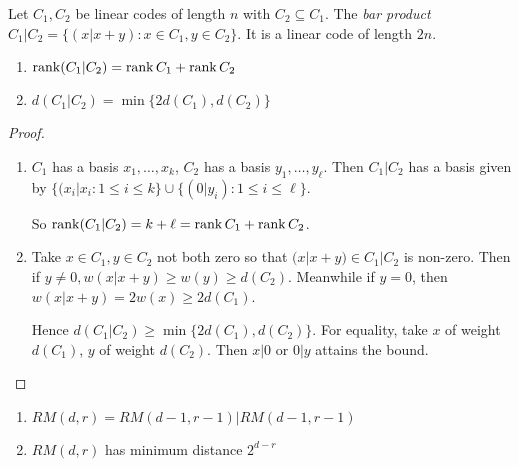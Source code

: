 \documentclass[10pt,a4paper]{article}
\begin{document}
Let $C_1, C_2$ be linear codes of length $n$ with $C_2 \subseteq C_1$. The \emph{bar product} $C_1|C_2 = \{(x|x+y) : x \in C_1, y \in C_2\}$. It is a linear code of length $2n$.
\begin{lemma}
\item
\begin{enumerate}
\item $\operatorname{rank}(C_1|C_2) = \operatorname{rank} C_1 + \operatorname{rank} C_2$
\item $d(C_1|C_2) = \min\{2d(C_1), d(C_2)\}$
\end{enumerate}
\end{lemma}
\begin{proof}
\item
\begin{enumerate}
\item $C_1$ has a basis $x_1, \ldots, x_k$, $C_2$ has a basis $y_1, \ldots, y_\ell$. Then $C_1|C_2$ has a basis given by $\{(x_i|x_i: 1\leq i \leq k\}\cup\{(0|y_i):1\leq i \leq \ell\}$.

So $\operatorname{rank}(C_1|C_2) = k + \ell = \operatorname{rank} C_1 + \operatorname{rank} C_2$.

\item Take $x \in C_1, y \in C_2$ not both zero so that $(x|x+y) \in C_1|C_2$ is non-zero. Then if $y \neq 0, w(x|x+y) \geq w(y) \geq d(C_2)$. Meanwhile if $y=0$, then $w(x|x+y) = 2w(x) \geq 2d(C_1)$.

Hence $d(C_1|C_2) \geq \min \{2d(C_1), d(C_2)\}$. For equality, take $x$ of weight $d(C_1)$, $y$ of weight $d(C_2)$. Then $x|0$ or $0|y$ attains the bound.
\end{enumerate}
\end{proof}
\begin{theorem}
\item
\begin{enumerate}
\item $RM(d,r) = RM(d-1,r-1)|RM(d-1,r-1)$
\item $RM(d,r)$ has minimum distance $2^{d-r}$
\end{enumerate}
\end{theorem}
\end{document}
